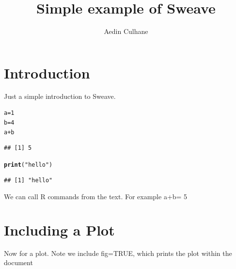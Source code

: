 \documentclass{article}\usepackage[]{graphicx}\usepackage[]{color}
\makeatletter
\newcommand{\hlnum}[1]{\textcolor[rgb]{0.686,0.059,0.569}{#1}}%
\newcommand{\hlstr}[1]{\textcolor[rgb]{0.192,0.494,0.8}{#1}}%
\newcommand{\hlopt}[1]{\textcolor[rgb]{0,0,0}{#1}}%
\newcommand{\hlstd}[1]{\textcolor[rgb]{0.345,0.345,0.345}{#1}}%
\newcommand{\hlkwb}[1]{\textcolor[rgb]{0.69,0.353,0.396}{#1}}%
\newcommand{\hlkwd}[1]{\textcolor[rgb]{0.737,0.353,0.396}{\textbf{#1}}}%
\newenvironment{kframe}{%
 \def\at@end@of@kframe{}%
 \ifinner\ifhmode%
  \def\at@end@of@kframe{\end{minipage}}%
  \begin{minipage}{\columnwidth}%
 \fi\fi%
 \def\FrameCommand##1{\hskip\@totalleftmargin \hskip-\fboxsep
 \colorbox{shadecolor}{##1}\hskip-\fboxsep
     \hskip-\linewidth \hskip-\@totalleftmargin \hskip\columnwidth}%
 \MakeFramed {\advance\hsize-\width
   \@totalleftmargin\z@ \linewidth\hsize
   \@setminipage}}%
 {\par\unskip\endMakeFramed%
 \at@end@of@kframe}
\newenvironment{knitrout}{}{} %
\makeatother
\begin{document}
\title{Simple example of Sweave}
\author{Aedin Culhane}


\maketitle
\tableofcontents


\section{Introduction}

Just a simple introduction to Sweave. 

\begin{knitrout}
\color{fgcolor}\begin{kframe}
\begin{alltt}
\hlstd{a}\hlkwb{=}\hlnum{1}
\hlstd{b}\hlkwb{=}\hlnum{4}
\hlstd{a}\hlopt{+}\hlstd{b}
\end{alltt}
\begin{verbatim}
## [1] 5
\end{verbatim}
\begin{alltt}
\hlkwd{print}\hlstd{(}\hlstr{"hello"}\hlstd{)}
\end{alltt}
\begin{verbatim}
## [1] "hello"
\end{verbatim}
\end{kframe}
\end{knitrout}

We can call R commands from the text. For example a+b= 5

\section{Including a Plot}
Now for a plot.  Note we include fig=TRUE, which prints the plot within the document
\end{document}

